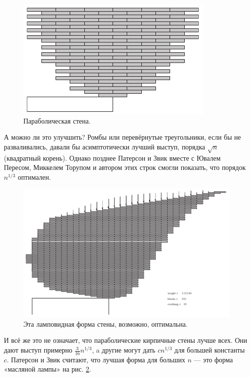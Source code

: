 \begin{figure}[htb!]
\centering
\includegraphics[scale=1]{pics/kirpich7}
\caption{Параболическая стена.}
\label{pic:kirpich7}
\end{figure}

А можно ли это улучшить?
Ромбы или перевёрнутые треугольники, если бы не разваливались, давали бы асимптотически лучший выступ, порядка $\sqrt{n}$ (квадратный корень).
Однако позднее Патерсон и Звик вместе с Ювалем Пересом, Миккелем Торупом и автором этих строк \cite{48} смогли показать, что порядок $n^{1/3}$ оптимален.

\begin{figure}[htb!]
\centering
\includegraphics[scale=1]{pics/kirpich8}
\caption{Эта ламповидная форма стены, возможно, оптимальна.}
\label{pic:kirpich8}
\end{figure}

И всё же это не означает, что параболические кирпичные стены лучше всех.
Они дают выступ примерно $\tfrac3{16}n^{1/3}$, a другие могут дать $cn^{1/3}$ для большей константы $c$.
Патерсон и Звик считают, что лучшая форма для больших $n$ --- это форма «масляной лампы» на рис. \ref{pic:kirpich8}.

